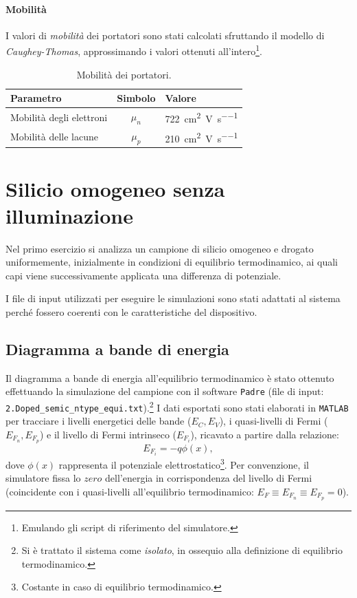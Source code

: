 \documentclass[a4paper,11pt]{report}
\begin{document}
\subsubsection{Mobilità} 
I valori di \textit{mobilità} dei portatori sono stati calcolati sfruttando il modello di \textit{Caughey-Thomas}, approssimando i valori ottenuti all'intero\footnote{Emulando gli script di riferimento del simulatore.}.
\begin{table}[h!]
    \centering
    \renewcommand{\arraystretch}{0.85} %
    \caption{Mobilità dei portatori.}
    \label{tab:mobilità}
    \begin{tabular}{@{}l c l@{}}
        \toprule
        \textbf{Parametro} & \textbf{Simbolo} & \textbf{Valore} \\
        \midrule
        Mobilità degli elettroni & $\mu_n$ & \SI{722}{\centi\meter\squared\per\volt\per\second} \\
        Mobilità delle lacune & $\mu_p$ & \SI{210}{\centi\meter\squared\per\volt\per\second} \\
 \bottomrule
    \end{tabular}
\end{table}



\chapter{Silicio omogeneo senza illuminazione}
Nel primo esercizio si analizza un campione di silicio omogeneo e drogato uniformemente, inizialmente in condizioni di equilibrio termodinamico, ai quali capi viene successivamente applicata una differenza di potenziale. 

I file di input utilizzati per eseguire le simulazioni sono stati adattati al sistema perché fossero coerenti con le caratteristiche del dispositivo.

\section{Diagramma a bande di energia}
Il diagramma a bande di energia all'equilibrio termodinamico è stato ottenuto effettuando la simulazione del campione con il software \texttt{Padre} (file di input: \texttt{2.Doped\_semic\_ntype\_equi.txt}).\footnote{Si è trattato il sistema come \textit{isolato}, in ossequio alla definizione di equilibrio termodinamico.} I dati esportati sono stati elaborati in \texttt{MATLAB} per tracciare i livelli energetici delle bande ($E_C, E_V$), i quasi-livelli di Fermi ($E_{F_n}, E_{F_p}$) e il livello di Fermi intrinseco ($E_{F_i}$), ricavato a partire dalla relazione:
\begin{equation}
E_{F_i} = -q\phi(x),
\end{equation} 
dove $\phi(x)$ rappresenta il potenziale elettrostatico\footnote{Costante in caso di equilibrio termodinamico.}. Per convenzione, il simulatore fissa lo $zero$ dell'energia in corrispondenza del livello di Fermi (coincidente con i quasi-livelli all'equilibrio termodinamico: $E_F \equiv E_{F_n} \equiv E_{F_p} = 0$).
\end{document}
